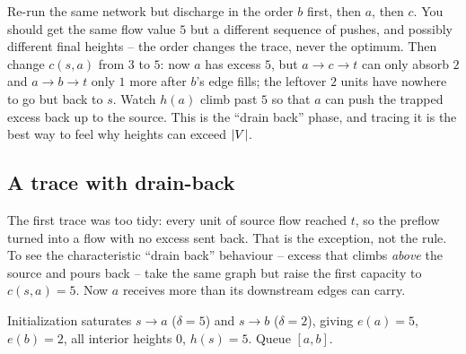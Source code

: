 \begin{labbox}
Re-run the same network but discharge in the order $b$ first, then $a$, then $c$. You should get the same flow value $5$ but a different sequence of pushes, and possibly different final heights -- the order changes the trace, never the optimum. Then change $c(s,a)$ from $3$ to $5$: now $a$ has excess $5$, but $a\!\to\!c\!\to\!t$ can only absorb $2$ and $a\!\to\!b\!\to\!t$ only $1$ more after $b$'s edge fills; the leftover $2$ units have nowhere to go but back to $s$. Watch $h(a)$ climb past $5$ so that $a$ can push the trapped excess back up to the source. This is the ``drain back'' phase, and tracing it is the best way to feel why heights can exceed $\lvert V\rvert$.
\end{labbox}

\subsection{A trace with drain-back}
\label{ch13:trace-drain}

The first trace was too tidy: every unit of source flow reached $t$, so the preflow turned into a flow with no excess sent back. That is the exception, not the rule. To see the characteristic ``drain back'' behaviour -- excess that climbs \emph{above} the source and pours back -- take the same graph but raise the first capacity to $c(s,a)=5$. Now $a$ receives more than its downstream edges can carry.

\begin{center}
\end{center}

Initialization saturates $s\!\to\!a$ ($\delta=5$) and $s\!\to\!b$ ($\delta=2$), giving $e(a)=5$, $e(b)=2$, all interior heights $0$, $h(s)=5$. Queue $[a,b]$.

